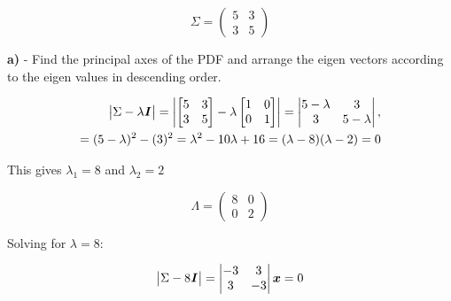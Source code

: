 \documentclass{homeworg}
\begin{document}
\begin{equation}
    \Sigma = 
    \begin{pmatrix}
        5&3 \\ 
        3&5 
    \end{pmatrix}
\end{equation}



\textbf{a)} - Find the principal axes of the PDF and arrange the eigen vectors 
according to the eigen values in descending order.
\smallskip

\begin{equation}
    \begin{aligned}
        \begin{vmatrix}
            \Sigma - \lambda \textbf{\textit{I}}
        \end{vmatrix}
        =
        \begin{vmatrix}
            \begin{bmatrix}
                5 &3 
                \\ 
                3 & 5
            \end{bmatrix} -
            \lambda
            \begin{bmatrix}
                1 & 0  
                \\ 
                0 & 1
            \end{bmatrix}
        \end{vmatrix}
        =
        \begin{vmatrix}
            5-\lambda&3 \\ 
            3& 5-\lambda
        \end{vmatrix}, \\
        = (5-\lambda)^2-(3)^2
        = \lambda^2-10\lambda+16
        = (\lambda-8)(\lambda-2) = 0
    \end{aligned}
\end{equation}

This gives $\lambda_1 = 8$ and $\lambda_2 = 2$

\begin{equation}
    \Lambda = 
    \begin{pmatrix}
        8&0 \\ 
        0&2
    \end{pmatrix}
\end{equation}

Solving for $\lambda = 8$:

\begin{equation}
    \begin{vmatrix}
        \Sigma - 8\textbf{\textit{I}}
    \end{vmatrix}
    = 
    \begin{vmatrix}
        -3 & 3 \\
        3 & -3
    \end{vmatrix}\bm{x}
    = 0
\end{equation}
\end{document}
